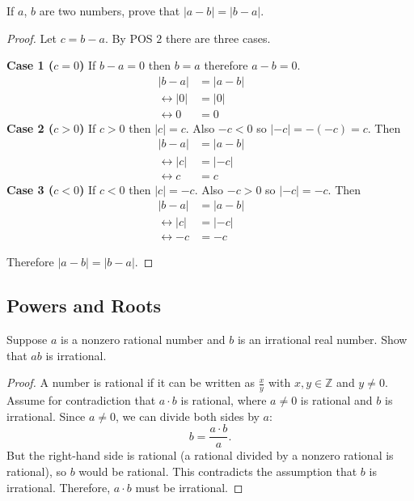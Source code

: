\begin{tcolorbox}[title=Problem 20, breakable]
    If $a$, $b$ are two numbers, prove that $|a - b| = |b - a|$.
\end{tcolorbox}

\begin{proof}
    Let $c = b - a$. By POS $2$ there are three cases.
    
    \textbf{Case 1 ($c = 0$)}
    If $b - a = 0$ then $b = a$ therefore $a - b = 0$.
    \begin{align*}
        |b - a| &= |a - b| && \\
        \leftrightarrow |0| &= |0| && \\
        \leftrightarrow 0 &= 0 
    \end{align*}
    \textbf{Case 2 ($c > 0$)}
    If $c > 0$ then $|c| = c$. Also $-c < 0$ so $|-c| = -(-c) = c$. Then
    \begin{align*}
        |b - a| &= |a - b| && \\
        \leftrightarrow |c| &= |-c| && \\
        \leftrightarrow c &= c
    \end{align*}
    \textbf{Case 3 ($c < 0$)}
    If $c < 0$ then $|c| = -c$. Also $-c > 0$ so $|-c| = -c$. Then
    \begin{align*}
        |b - a| &= |a - b| && \\
        \leftrightarrow |c| &= |-c| && \\
        \leftrightarrow -c &= -c
    \end{align*}

    Therefore $|a - b| = |b - a|$.
\end{proof}

\subsection{Powers and Roots}

\begin{tcolorbox}[title=Extra Problem, breakable]
    Suppose $a$ is a nonzero rational number and $b$ is an irrational real number.
    Show that $ab$ is irrational.
\end{tcolorbox}

\begin{proof}
    A number is rational if it can be written as $\frac{x}{y}$ with $x, y \in \mathbb{Z}$ and $y \neq 0$.  
    Assume for contradiction that $a \cdot b$ is rational, where $a \neq 0$ is rational and $b$ is irrational.  
    Since $a \neq 0$, we can divide both sides by $a$:  
    \[
        b = \frac{a \cdot b}{a}.
    \]  
    But the right-hand side is rational (a rational divided by a nonzero rational is rational), so $b$ would be rational.  
    This contradicts the assumption that $b$ is irrational.  
    Therefore, $a \cdot b$ must be irrational.
\end{proof}

